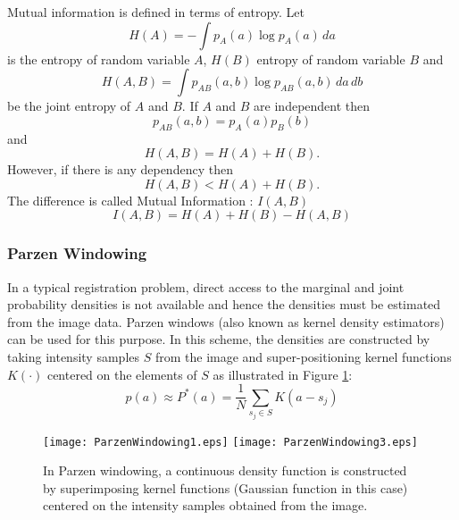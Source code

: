 Mutual information is defined in terms of entropy. Let
\begin{equation}
H(A) = - \int p_A(a) \log p_A(a)\, da
\end{equation}
is the entropy of random variable $A$, $H(B)$ entropy of 
random variable $B$ and 
\begin{equation}
H(A,B) = \int p_{AB}(a,b) \log p_{AB}(a,b)\,da\,db
\end{equation}
be the joint entropy of $A$ and $B$. If $A$ and $B$ are independent then
\begin{equation}
p_{AB}(a,b) = p_A(a) p_B(b)
\end{equation}
and
\begin{equation}
H(A,B) = H(A) + H(B).
\end{equation}
However, if there is any dependency then
\begin{equation}
H(A,B)<H(A)+H(B).
\end{equation}
The difference is called Mutual Information : \( I(A,B) \)
\begin{equation}
I(A,B)=H(A)+H(B)-H(A,B)
\end{equation}

\subsubsection{Parzen Windowing}
In a typical registration problem, direct access to the marginal 
and joint probability densities is not available and hence the
densities must be estimated from the image data. Parzen windows 
(also known as kernel density estimators) can be used for this purpose.
In this scheme, the densities are constructed by taking intensity 
samples $S$ from the image and super-positioning kernel functions 
$K(\cdot)$ centered on the elements of $S$ as illustrated in
Figure \ref{fig:ParzenWindowing}:
\begin{equation}
p(a) \approx P^{*}(a) = \frac{1}{N} \sum_{s_j \in S} K\left(a - s_j\right)
\end{equation}

\begin{figure}
\center
\texttt{[image: ParzenWindowing1.eps]}
\texttt{[image: ParzenWindowing3.eps]}
\caption[Parzen windowing in Mutual Information]{ In Parzen windowing, a
continuous density function is constructed by superimposing kernel functions
(Gaussian function in this case) centered on the intensity samples obtained
from the image. }
\label{fig:ParzenWindowing}
\end{figure}

